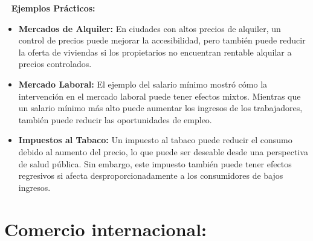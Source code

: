 \documentclass[
  letterpaper,
  DIV=11,
  numbers=noendperiod]{scrreport}
\begin{document}
\begin{multicols}{2}

\end{multicols}

~ \textbf{Ejemplos Prácticos:}

\begin{itemize}
\item
  \textbf{Mercados de Alquiler:} En ciudades con altos precios de
  alquiler, un control de precios puede mejorar la accesibilidad, pero
  también puede reducir la oferta de viviendas si los propietarios no
  encuentran rentable alquilar a precios controlados.
\item
  \textbf{Mercado Laboral:} El ejemplo del salario mínimo mostró cómo la
  intervención en el mercado laboral puede tener efectos mixtos.
  Mientras que un salario mínimo más alto puede aumentar los ingresos de
  los trabajadores, también puede reducir las oportunidades de empleo.
\item
  \textbf{Impuestos al Tabaco:} Un impuesto al tabaco puede reducir el
  consumo debido al aumento del precio, lo que puede ser deseable desde
  una perspectiva de salud pública. Sin embargo, este impuesto también
  puede tener efectos regresivos si afecta desproporcionadamente a los
  consumidores de bajos ingresos.
\end{itemize}

\hypertarget{comercio-internacional}{%
\section{Comercio internacional:}\label{comercio-internacional}}
\end{document}
